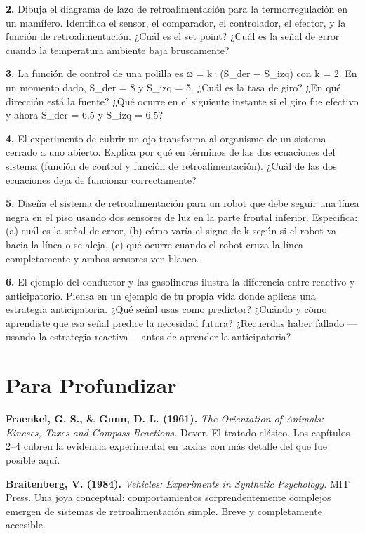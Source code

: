 \documentclass[
  letterpaper,
  DIV=11,
  numbers=noendperiod]{scrreprt}
\begin{document}
\begin{tcolorbox}[enhanced jigsaw, arc=.35mm, bottomrule=.15mm, breakable, colback=white, colframe=quarto-callout-note-color-frame, left=2mm, leftrule=.75mm, opacityback=0, rightrule=.15mm, toprule=.15mm]
\textbf{2.} Dibuja el diagrama de lazo de retroalimentación para la
termorregulación en un mamífero. Identifica el sensor, el comparador, el
controlador, el efector, y la función de retroalimentación. ¿Cuál es el
set point? ¿Cuál es la señal de error cuando la temperatura ambiente
baja bruscamente?

\textbf{3.} La función de control de una polilla es ω = k·(S\_der −
S\_izq) con k = 2. En un momento dado, S\_der = 8 y S\_izq = 5. ¿Cuál es
la tasa de giro? ¿En qué dirección está la fuente? ¿Qué ocurre en el
siguiente instante si el giro fue efectivo y ahora S\_der = 6.5 y S\_izq
= 6.5?

\textbf{4.} El experimento de cubrir un ojo transforma al organismo de
un sistema cerrado a uno abierto. Explica por qué en términos de las dos
ecuaciones del sistema (función de control y función de
retroalimentación). ¿Cuál de las dos ecuaciones deja de funcionar
correctamente?

\textbf{5.} Diseña el sistema de retroalimentación para un robot que
debe seguir una línea negra en el piso usando dos sensores de luz en la
parte frontal inferior. Especifica: (a) cuál es la señal de error, (b)
cómo varía el signo de k según si el robot va hacia la línea o se aleja,
(c) qué ocurre cuando el robot cruza la línea completamente y ambos
sensores ven blanco.

\textbf{6.} El ejemplo del conductor y las gasolineras ilustra la
diferencia entre reactivo y anticipatorio. Piensa en un ejemplo de tu
propia vida donde aplicas una estrategia anticipatoria. ¿Qué señal usas
como predictor? ¿Cuándo y cómo aprendiste que esa señal predice la
necesidad futura? ¿Recuerdas haber fallado ---usando la estrategia
reactiva--- antes de aprender la anticipatoria?

\section{Para Profundizar}\label{para-profundizar}

\textbf{Fraenkel, G. S., \& Gunn, D. L. (1961).} \emph{The Orientation
of Animals: Kineses, Taxes and Compass Reactions.} Dover. El tratado
clásico. Los capítulos 2--4 cubren la evidencia experimental en taxias
con más detalle del que fue posible aquí.

\textbf{Braitenberg, V. (1984).} \emph{Vehicles: Experiments in
Synthetic Psychology.} MIT Press. Una joya conceptual: comportamientos
sorprendentemente complejos emergen de sistemas de retroalimentación
simple. Breve y completamente accesible.


\end{tcolorbox}
\end{document}
